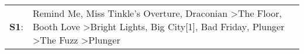 \begin{supertabular}{p{0.03\textwidth}p{0.92\textwidth}}
 \textbf{S1}:  &  Remind Me\textsuperscript{}, \enspace Miss Tinkle's Overture\textsuperscript{}, \enspace Draconian\textsuperscript{} \textgreater \enspace The Floor\textsuperscript{}, \enspace Booth Love\textsuperscript{} \textgreater \enspace Bright Lights, Big City[1]\textsuperscript{}, \enspace Bad Friday\textsuperscript{}, \enspace Plunger\textsuperscript{} \textgreater \enspace The Fuzz\textsuperscript{} \textgreater \enspace Plunger\textsuperscript{}  \enspace  \\
\end{supertabular}
